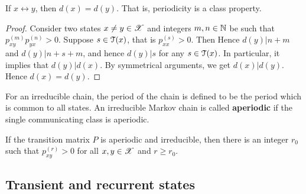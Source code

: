 \documentclass[letterpaper,10pt,english]{article}
\begin{document}
\begin{prop}
If $x \leftrightarrow y$, then $d(x) = d(y)$. 
That is, periodicity is a class property.
\end{prop}
\begin{proof}
Consider two states $x\neq y \in \mathscr{X}$ and integers $m,n \in \mathbb{N}$ be such that $p_{xy}^{(m)}p_{yx}^{(n)} > 0$. 
Suppose $s \in \mathcal{T}(x)$, that is $p_{xx}^{(s)} > 0$. Then
Hence $d(y) | n+m$ and $d(y) | n+s+m$, and hence $d(y) | s$ for any $s \in \mathcal{T}(x)$. 
In particular, it implies that $d(y) | d(x)$. 
By symmetrical arguments, we get $d(x) | d(y)$. 
Hence $d(x) = d(y)$.
\end{proof}
\begin{defn}
For an irreducible chain, the period of the chain is defined to be the period which is common to all states. 
An irreducible Markov chain is called \textbf{aperiodic} if the single communicating class is aperiodic. 
\end{defn}
\begin{prop}
If the transition matrix $P$ is aperiodic and irreducible, 
then there is an integer $r_0$ such that $p_{xy}^{(r)}>0$ for all $x,y \in \mathscr{X}$  and $r \ge r_0$. 
\end{prop}

\subsection{Transient and recurrent states}

\end{document}
